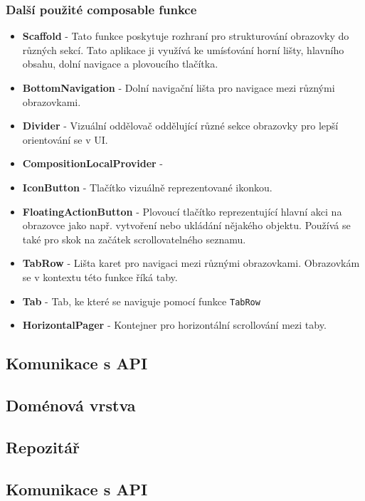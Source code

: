 \subsubsection*{Další použité composable funkce}

\begin{itemize}
	\item \textbf{Scaffold} - Tato funkce poskytuje rozhraní pro strukturování obrazovky do různých sekcí. Tato aplikace ji využívá ke umísťování horní lišty, hlavního obsahu, dolní navigace a plovoucího tlačítka.
	\item \textbf{BottomNavigation} - Dolní navigační lišta pro navigace mezi různými obrazovkami. 
	\item \textbf{Divider} - Vizuální oddělovač oddělující různé sekce obrazovky pro lepší orientování se v UI.
	\item \textbf{CompositionLocalProvider} - 
	\item \textbf{IconButton} - Tlačítko vizuálně reprezentované ikonkou. 
	\item \textbf{FloatingActionButton} - Plovoucí tlačítko reprezentující hlavní akci na obrazovce jako např. vytvoření nebo ukládání nějakého objektu. Používá se také pro skok na začátek scrollovatelného seznamu.
	\item \textbf{TabRow} - Lišta karet pro navigaci mezi různými obrazovkami. Obrazovkám se v kontextu této funkce říká taby.
	\item \textbf{Tab} - Tab, ke které se naviguje pomocí funkce \lstinline|TabRow|
	\item \textbf{HorizontalPager} - Kontejner pro horizontální scrollování mezi taby.
\end{itemize}

\subsection {Komunikace s API}

\subsection {Doménová vrstva}

\subsection {Repozitář}

\subsection {Komunikace s API}


